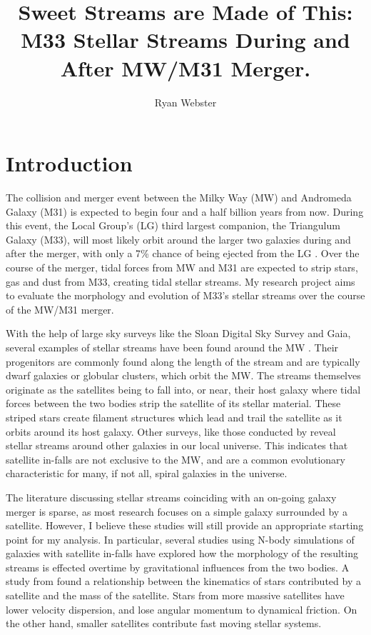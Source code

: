 \documentclass{aastex62}
\begin{document}
\title{Sweet Streams are Made of This: M33 Stellar Streams During and After MW/M31 Merger.}

\author{Ryan Webster}

\section{Introduction} \label{sec:intro}

The collision and merger event between the Milky Way (MW) and Andromeda Galaxy (M31) is expected to begin four and a half billion years from now. During this event, the Local Group's (LG) third largest companion, the Triangulum Galaxy (M33), will most likely orbit around the larger two galaxies during and after the merger, with only a 7{\%} chance of being ejected from the LG \cite{van_der_Marel_2012}. Over the course of the merger, tidal forces from MW and M31 are expected to strip stars, gas and dust from M33, creating tidal stellar streams. My research project aims to evaluate the morphology and evolution of M33's stellar streams over the course of the MW/M31 merger. 

With the help of large sky surveys like the Sloan Digital Sky Survey and Gaia, several examples of stellar streams have been found around the MW \cite{article}. Their progenitors are commonly found along the length of the stream and are typically dwarf galaxies or globular clusters, which orbit the MW. The streams themselves originate as the satellites being to fall into, or near, their host galaxy where tidal forces between the two bodies strip the satellite of its stellar material. These striped stars create filament structures which lead and trail the satellite as it orbits around its host galaxy. Other surveys, like those conducted by \cite{Mart_nez_Delgado_2010} reveal stellar streams around other galaxies in our local universe. This indicates that satellite in-falls are not exclusive to the MW, and are a common evolutionary characteristic for many, if not all, spiral galaxies in the universe.

The literature discussing stellar streams coinciding with an on-going galaxy merger is sparse, as most research focuses on a simple galaxy surrounded by a satellite. However, I believe these studies will still provide an appropriate starting point for my analysis. In particular, several studies using N-body simulations of galaxies with satellite in-falls have explored how the morphology of the resulting streams is effected overtime by gravitational influences from the two bodies. A study from \cite{10.1093/mnras/stw2229} found a relationship between the kinematics of stars contributed by a satellite and the mass of the satellite. Stars from more massive satellites have lower velocity dispersion, and lose angular momentum to dynamical friction. On the other hand, smaller satellites contribute fast moving stellar systems. 
\end{document}

